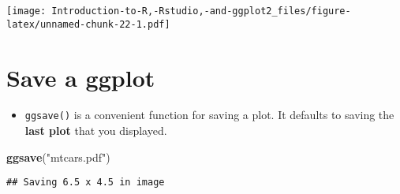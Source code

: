 \documentclass[]{book}
\newenvironment{Shaded}{\begin{snugshade}}{\end{snugshade}}
\newcommand{\KeywordTok}[1]{\textcolor[rgb]{0.13,0.29,0.53}{\textbf{{#1}}}}
\newcommand{\StringTok}[1]{\textcolor[rgb]{0.31,0.60,0.02}{{#1}}}
\newcommand{\NormalTok}[1]{{#1}}
\providecommand{\tightlist}{%
  \setlength{\itemsep}{0pt}\setlength{\parskip}{0pt}}
\begin{document}
\texttt{[image: Introduction-to-R,-Rstudio,-and-ggplot2\_files/figure-latex/unnamed-chunk-22-1.pdf]}

\section{Save a ggplot}\label{save-a-ggplot}

\begin{itemize}
\tightlist
\item
  \texttt{ggsave()} is a convenient function for saving a plot. It
  defaults to saving the \textbf{last plot} that you displayed.
\end{itemize}

\begin{Shaded}
\begin{Highlighting}[]
\KeywordTok{ggsave}\NormalTok{(}\StringTok{"mtcars.pdf"}\NormalTok{)}
\end{Highlighting}
\end{Shaded}

\begin{verbatim}
## Saving 6.5 x 4.5 in image
\end{verbatim}


\end{document}
